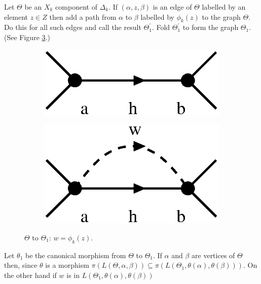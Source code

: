 \documentclass[a4paper,12pt]{article}
\renewcommand{\a}{\alpha }
\renewcommand{\b}{\beta }
\newcommand{\D}{\Delta }
\newcommand{\T}{\Theta }
\numberwithin{equation}{section}
\numberwithin{figure}{section}
\begin{document}
Let $\T$ be an $X_k$ component of $\D_k$. If $(\a,z,\b)$ is an
edge of $\T$ labelled by an element $z\in Z$ then add a path from
$\a$ to $\b$ labelled by $\phi_k(z)$ to the graph $\T$. Do this
for all such edges and call the result
$\T_1^\prime$. Fold $\T_1^\prime$ to form the graph 
$\T_1$. (See Figure \ref{fig:alg2-1}.)
\begin{figure}
\begin{center}
\psfrag{a}{$\a$}
\psfrag{b}{$\b$}
\begin{subfigure}[b]{.25\columnwidth}
\includegraphics[scale=.5]{alg2-1a.eps}
\label{fig:alg2-1a}
\end{subfigure}
\raisebox{3ex}{$\leadsto$}
\begin{subfigure}[b]{.25\columnwidth}
\psfrag{a}{$\a$}
\psfrag{b}{$\b$}
\includegraphics[scale=.5]{alg2-1b.eps}
\label{fig:alg2-1b}
\end{subfigure}
\end{center}
\caption{$\Theta$ to $\Theta_1$: $w=\phi_k(z)$.}\label{fig:alg2-1}
\end{figure}
Let $\theta_1$ be the canonical morphism from $\Theta$ to
$\Theta_1$. If $\a$ and $\b$ are vertices of $\Theta$ then, 
since $\theta$ is a morphism 
$\pi(L(\Theta, \a,\b))\subseteq \pi(L(\Theta_1,\theta(\a),\theta(\b)))$. 
On the other hand if $w$ is in  $L(\Theta_1,\theta(\a),\theta(\b))$
\end{document}
